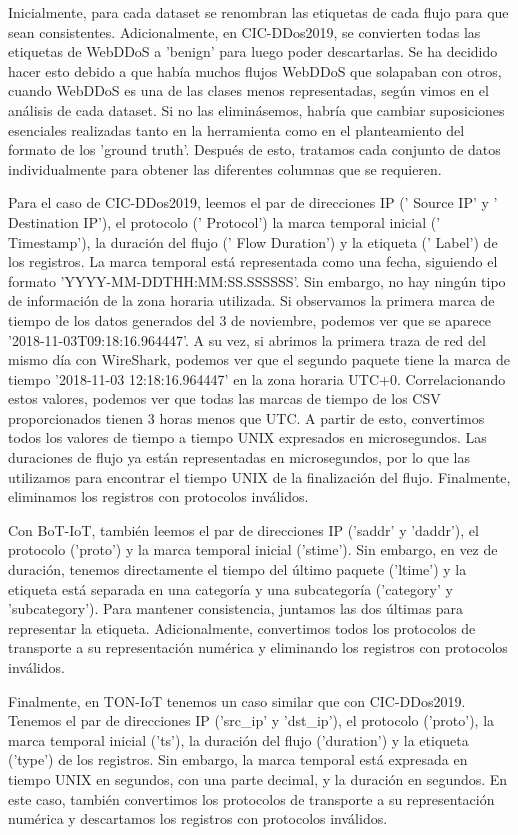 Inicialmente, para cada dataset se renombran las etiquetas de cada flujo para que sean consistentes. Adicionalmente, en CIC-DDos2019, se convierten todas las etiquetas de WebDDoS a 'benign' para luego poder descartarlas. Se ha decidido hacer esto debido a que había muchos flujos WebDDoS que solapaban con otros, cuando WebDDoS es una de las clases menos representadas, según vimos en el análisis de cada dataset. Si no las eliminásemos, habría que cambiar suposiciones esenciales realizadas tanto en la herramienta como en el planteamiento del formato de los 'ground truth'. Después de esto, tratamos cada conjunto de datos individualmente para obtener las diferentes columnas que se requieren.

Para el caso de CIC-DDos2019, leemos el par de direcciones IP (' Source IP' y ' Destination IP'), el protocolo (' Protocol') la marca temporal inicial (' Timestamp'), la duración del flujo (' Flow Duration') y la etiqueta (' Label') de los registros. La marca temporal está representada como una fecha, siguiendo el formato 'YYYY-MM-DDTHH:MM:SS.SSSSSS'. Sin embargo, no hay ningún tipo de información de la zona horaria utilizada. Si observamos la primera marca de tiempo de los datos generados del 3 de noviembre, podemos ver que se aparece '2018-11-03T09:18:16.964447'. A su vez, si abrimos la primera traza de red del mismo día con WireShark, podemos ver que el segundo paquete tiene la marca de tiempo '2018-11-03 12:18:16.964447' en la zona horaria UTC+0. Correlacionando estos valores, podemos ver que todas las marcas de tiempo de los CSV proporcionados tienen 3 horas menos que UTC. A partir de esto, convertimos todos los valores de tiempo a tiempo UNIX expresados en microsegundos. Las duraciones de flujo ya están representadas en microsegundos, por lo que las utilizamos para encontrar el tiempo UNIX de la finalización del flujo. Finalmente, eliminamos los registros con protocolos inválidos.

Con BoT-IoT, también leemos el par de direcciones IP ('saddr' y 'daddr'), el protocolo ('proto') y la marca temporal inicial ('stime'). Sin embargo, en vez de duración, tenemos directamente el tiempo del último paquete ('ltime') y la etiqueta está separada en una categoría y una subcategoría ('category' y 'subcategory'). Para mantener consistencia, juntamos las dos últimas para representar la etiqueta. Adicionalmente, convertimos todos los protocolos de transporte a su representación numérica y eliminando los registros con protocolos inválidos.

Finalmente, en TON-IoT tenemos un caso similar que con CIC-DDos2019. Tenemos el par de direcciones IP  ('src\_ip' y 'dst\_ip'), el protocolo ('proto'), la marca temporal inicial ('ts'), la duración del flujo ('duration') y la etiqueta ('type') de los registros. Sin embargo, la marca temporal está expresada en tiempo UNIX en segundos, con una parte decimal, y la duración en segundos. En este caso, también convertimos los protocolos de transporte a su representación numérica y descartamos los registros con protocolos inválidos.

